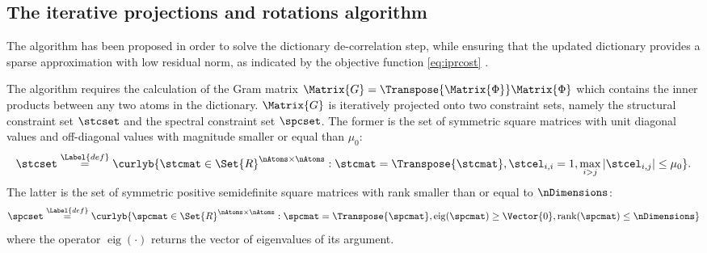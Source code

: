 \documentclass{article}
\def \Dic{\Matrix{\Phi}} %
\def \coherence{\mu} 		%
\def \definition{\overset{\Label{def}}{=}}	%
\def \Gram{\Matrix{G}} 						%
\def \ambient{\Set{R}} 						%
\begin{document}
\subsection{The iterative projections and rotations algorithm}\label{sec:ipr}
The  algorithm has been proposed in order to solve the dictionary de-correlation step, while ensuring that the updated dictionary provides a sparse approximation with low residual norm, as indicated by the objective function \eqref{eq:iprcost} \cite{Barchiesi2013Le}.

The  algorithm requires the calculation of the Gram matrix $\Gram=\Transpose{\Dic}\Dic$ which contains the inner products between any two atoms in the dictionary. $\Gram$ is iteratively projected onto two constraint sets, namely the structural constraint set $\stcset$ and the spectral constraint set $\spcset$. The former is the set of symmetric square matrices with unit diagonal values and off-diagonal values with magnitude smaller or equal than $\coherence_{0}$:
\small
\begin{equation*}
	\stcset \definition \curlyb{\stcmat \in \ambient^{\nAtoms \times \nAtoms} : \stcmat = \Transpose{\stcmat}, \stcel_{i,i}=1,\max_{i > j}|\stcel_{i,j}|\leq \coherence_{0}}.
\end{equation*}
\normalsize
The latter is the set of symmetric positive semidefinite square matrices with rank smaller than or equal to $\nDimensions$:
\begin{equation*}
\spcset \definition \curlyb{ \spcmat \in \ambient^{\nAtoms \times \nAtoms} : \spcmat = \Transpose{\spcmat}, \operatorname{eig}(\spcmat)\geq \Vector{0}, \operatorname{rank}(\spcmat)\leq \nDimensions}
\end{equation*}  
where the operator $\operatorname{eig}(\cdot)$ returns the vector of eigenvalues of its argument.
\end{document}
